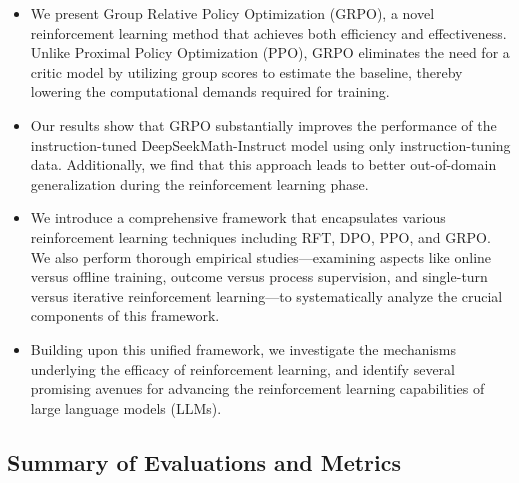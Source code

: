 \begin{itemize}[topsep=0pt]
    \item We present Group Relative Policy Optimization (GRPO), a novel reinforcement learning method that achieves both efficiency and effectiveness. Unlike Proximal Policy Optimization (PPO), GRPO eliminates the need for a critic model by utilizing group scores to estimate the baseline, thereby lowering the computational demands required for training.
    \item Our results show that GRPO substantially improves the performance of the instruction-tuned DeepSeekMath-Instruct model using only instruction-tuning data. Additionally, we find that this approach leads to better out-of-domain generalization during the reinforcement learning phase.
    \item We introduce a comprehensive framework that encapsulates various reinforcement learning techniques including RFT, DPO, PPO, and GRPO. We also perform thorough empirical studies—examining aspects like online versus offline training, outcome versus process supervision, and single-turn versus iterative reinforcement learning—to systematically analyze the crucial components of this framework.
    \item Building upon this unified framework, we investigate the mechanisms underlying the efficacy of reinforcement learning, and identify several promising avenues for advancing the reinforcement learning capabilities of large language models (LLMs).
\end{itemize}

\subsection{Summary of Evaluations and Metrics}

